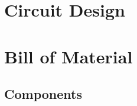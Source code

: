 \documentclass[a4paper,12pt,oneside,pdflatex,italian,final,twocolumn]{article}
\begin{document}
	\section{Circuit Design}
	
	
	
	
	
	\newpage
	\section{Bill of Material}
	
	\subsection{Components}
	
\end{document}
